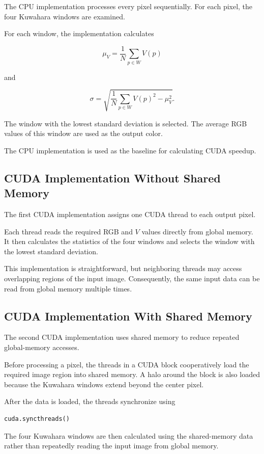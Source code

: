 \documentclass[11pt]{article}
\begin{document}
The CPU implementation processes every pixel sequentially. For each
pixel, the four Kuwahara windows are examined.

For each window, the implementation calculates

\[
\mu_V = \frac{1}{N}\sum_{p\in W} V(p)
\]

and

\[
\sigma =
\sqrt{
\frac{1}{N}\sum_{p\in W}V(p)^2
-
\mu_V^2
}.
\]

The window with the lowest standard deviation is selected. The average
RGB values of this window are used as the output color.

The CPU implementation is used as the baseline for calculating CUDA
speedup.

\subsection{CUDA Implementation Without Shared Memory}

The first CUDA implementation assigns one CUDA thread to each output
pixel.

Each thread reads the required RGB and $V$ values directly from global
memory. It then calculates the statistics of the four windows and
selects the window with the lowest standard deviation.

This implementation is straightforward, but neighboring threads may
access overlapping regions of the input image. Consequently, the same
input data can be read from global memory multiple times.

\subsection{CUDA Implementation With Shared Memory}

The second CUDA implementation uses shared memory to reduce repeated
global-memory accesses.

Before processing a pixel, the threads in a CUDA block cooperatively
load the required image region into shared memory. A halo around the
block is also loaded because the Kuwahara windows extend beyond the
center pixel.

After the data is loaded, the threads synchronize using

\begin{verbatim}
cuda.syncthreads()
\end{verbatim}

The four Kuwahara windows are then calculated using the shared-memory
data rather than repeatedly reading the input image from global memory.
\end{document}
